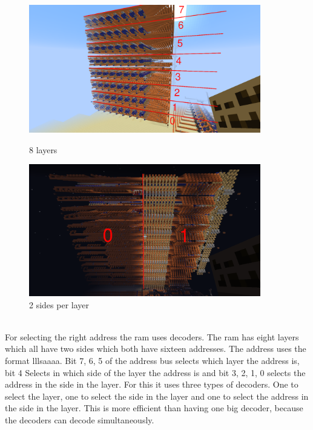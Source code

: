 \documentclass{article}
\begin{document}
\begin{figure}[h]
    \centering
    \begin{minipage}{0.5\textwidth}
        \centering
        \includegraphics[width=0.9\textwidth]{Ram layers.png}
        \caption{8 layers}
    \end{minipage}\hfill
    \begin{minipage}{0.5\textwidth}
        \centering
        \includegraphics[width=0.9\textwidth]{Ram sides.png}
        \caption{2 sides per layer}
    \end{minipage}
\end{figure}

~\\
For selecting the right address the ram uses decoders. The ram has eight layers which all have two sides which both have sixteen addresses. The address uses the format lllsaaaa. Bit 7, 6, 5 of the address bus selects which layer the address is, bit 4 Selects in which side of the layer the address is and bit 3, 2, 1, 0 selects the address in the side in the layer. For this it uses three types of decoders. One to select the layer, one to select the side in the layer and one to select the address in the side in the layer. This is more efficient than having one big decoder, because the decoders can decode simultaneously.
\end{document}
